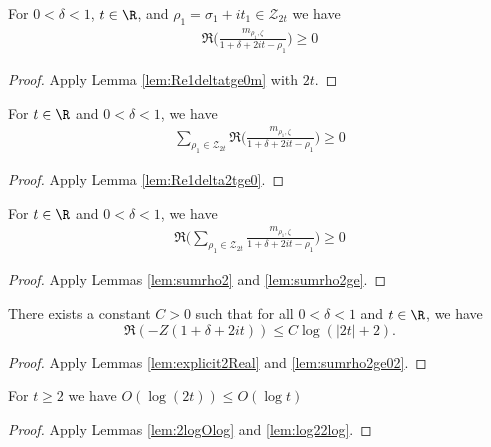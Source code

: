\begin{lemma}\label{lem:Re1delta2tge0}  \leanok
For $0<\delta<1$, $t\in\R$, and $\rho_1=\sigma_1+it_1\in \mathcal Z_{2t}$ we have
\begin{align*}
\Re\Big(\frac{m_{\rho_1,\zeta}}{1+\delta+2it-\rho_1}\Big) \ge 0
\end{align*}
\end{lemma}
\begin{proof} \leanok {}
Apply Lemma \ref{lem:Re1deltatge0m} with $2t$.
\end{proof}

\begin{lemma}\label{lem:sumrho2ge}  \leanok
For $t\in\R$ and $0<\delta<1$, we have
\begin{align*}
\sum_{\rho_1\in \mathcal Z_{2t}} \Re\Big(\frac{m_{\rho_1,\zeta}}{1+\delta+2it-\rho_1}\Big) \ge 0
\end{align*}
\end{lemma}
\begin{proof} \leanok {}
Apply Lemma \ref{lem:Re1delta2tge0}.
\end{proof}

\begin{lemma}\label{lem:sumrho2ge02}  \leanok
For $t\in\R$ and $0<\delta<1$, we have
\begin{align*}
\Re\Big(\sum_{\rho_1\in \mathcal Z_{2t}} \frac{m_{\rho_1,\zeta}}{1+\delta+2it-\rho_1}\Big) \ge 0
\end{align*}
\end{lemma}
\begin{proof} \leanok {}
Apply Lemmas \ref{lem:sumrho2} and \ref{lem:sumrho2ge}.
\end{proof}

\begin{lemma}\label{lem:explicit2Real2}  \leanok
There exists a constant $C>0$ such that for all $0<\delta<1$ and $t\in\R$, we have
\[ \Re\left(-Z(1+\delta+2it)\right) \le C\log(|2t|+2).\]
\end{lemma}
\begin{proof}  \leanok
Apply Lemmas \ref{lem:explicit2Real} and \ref{lem:sumrho2ge02}.
\end{proof}

\begin{lemma}\label{lem:log2Olog}  \leanok
For $t\ge 2$ we have $O(\log(2t)) \le O(\log t)$
\end{lemma}
\begin{proof} \leanok {} \leanok
Apply Lemmas \ref{lem:2logOlog} and \ref{lem:log22log}.
\end{proof}

